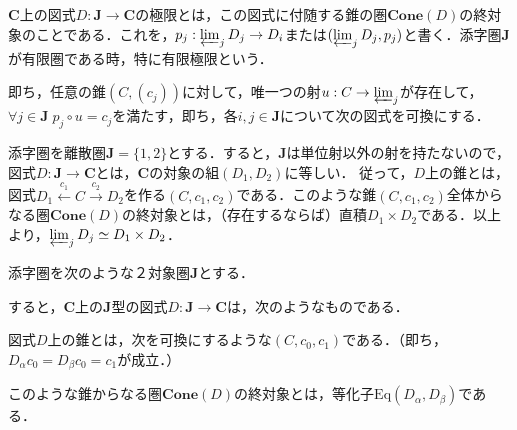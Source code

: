 \documentclass[uplatex, 12pt, dvipdfmx]{jsarticle}
\begin{document}
\begin{definition}[limit]
    $\mathbf{C}$上の図式$D:\mathbf{J}\to\mathbf{C}$の極限とは，この図式に付随する錐の圏$\mathbf{Cone}(D)$の終対象のことである．これを，$p_j:\varprojlim_jD_j\to D_i$または$(\varprojlim_jD_j,p_j)$と書く．添字圏$\mathbf{J}$が有限圏である時，特に有限極限という．

    即ち，任意の錐$(C,(c_j))$に対して，唯一つの射$u:C\to\varprojlim_j$が存在して，$\forall j\in\mathbf{J}\; p_j\circ u=c_j$を満たす，即ち，各$i,j\in\mathbf{J}$について次の図式を可換にする．
    \begin{center}
    \end{center}
\end{definition}

\begin{example}[直積]\label{example-product}
    添字圏を離散圏$\mathbf{J}=\{1,2\}$とする．すると，$\mathbf{J}$は単位射以外の射を持たないので，図式$D:\mathbf{J}\to\mathbf{C}$とは，$\mathbf{C}$の対象の組$(D_1,D_2)$に等しい．
    従って，$D$上の錐とは，図式$D_1\xleftarrow{c_1}C\xrightarrow{c_2}D_2$を作る$(C,c_1,c_2)$である．このような錐$(C,c_1,c_2)$全体からなる圏$\mathbf{Cone}(D)$の終対象とは，（存在するならば）直積$D_1\times D_2$である．以上より，$\varprojlim_jD_j\simeq D_1\times D_2$．
\end{example}

\begin{example}[等化子]\label{example-equalizer}
    添字圏を次のような２対象圏$\mathbf{J}$とする．
    \begin{center}
    \end{center}
    すると，$\mathbf{C}$上の$\mathbf{J}$型の図式$D:\mathbf{J}\to\mathbf{C}$は，次のようなものである．
    \begin{center}
    \end{center}
    図式$D$上の錐とは，次を可換にするような$(C,c_0,c_1)$である．（即ち，$D_\alpha c_0=D_\beta c_0=c_1$が成立．）
    \begin{center}
    \end{center}
    このような錐からなる圏$\mathbf{Cone}(D)$の終対象とは，等化子$\mathrm{Eq}(D_\alpha,D_\beta)$である．
\end{example}
\end{document}
